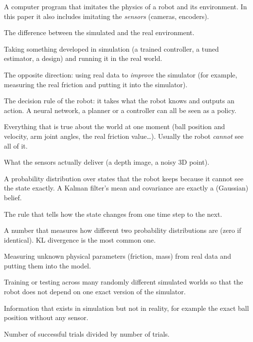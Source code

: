 \documentclass[11pt,a4paper]{article}
\begin{document}
\begin{description}[leftmargin=1.2cm,labelwidth=1cm,itemsep=3pt]
\item[Simulation] A computer program that imitates the physics of a robot and its environment.
In this paper it also includes imitating the \emph{sensors} (cameras, encoders).
\item[Reality gap] The difference between the simulated and the real environment.
\item[Sim-to-real transfer] Taking something developed in simulation (a trained controller,
a tuned estimator, a design) and running it in the real world.
\item[Real-to-sim] The opposite direction: using real data to \emph{improve} the simulator
(for example, measuring the real friction and putting it into the simulator).
\item[Policy $\pi$] The decision rule of the robot: it takes what the robot knows and outputs
an action. A neural network, a planner or a controller can all be seen as a policy.
\item[State $s$] Everything that is true about the world at one moment (ball position and
velocity, arm joint angles, the real friction value\ldots). Usually the robot \emph{cannot}
see all of it.
\item[Observation $z$] What the sensors actually deliver (a depth image, a noisy 3D point).
\item[Belief $b$] A probability distribution over states that the robot keeps because it cannot
see the state exactly. A Kalman filter's mean and covariance are exactly a (Gaussian) belief.
\item[Dynamics] The rule that tells how the state changes from one time step to the next.
\item[Divergence $D$] A number that measures how different two probability distributions are
(zero if identical). KL divergence is the most common one.
\item[System identification] Measuring unknown physical parameters (friction, mass) from real
data and putting them into the model.
\item[Domain randomization] Training or testing across many randomly different simulated
worlds so that the robot does not depend on one exact version of the simulator.
\item[Privileged information] Information that exists in simulation but not in reality, for
example the exact ball position without any sensor.
\item[Success rate] Number of successful trials divided by number of trials.
\end{description}
\end{document}
